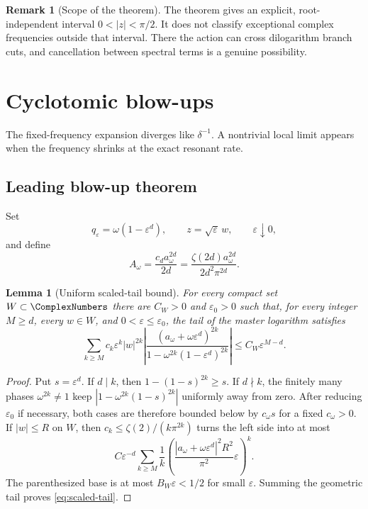 \documentclass[11pt]{article}
\newtheorem{lemma}[theorem]{Lemma}
\theoremstyle{definition}
\newtheorem{remark}[theorem]{Remark}
\newcommand{\eps}{\varepsilon}
\begin{document}
\begin{remark}[Scope of the theorem]
The theorem gives an explicit, root-independent interval
$0<|z|<\pi/2$.  It does not classify exceptional complex frequencies outside
that interval.  There the action can cross dilogarithm branch cuts, and
cancellation between spectral terms is a genuine possibility.
\end{remark}

\section{Cyclotomic blow-ups}

The fixed-frequency expansion diverges like $\delta^{-1}$.  A nontrivial local limit appears when the frequency shrinks at the exact resonant rate.

\subsection{Leading blow-up theorem}

Set
\begin{equation}
 q_\eps=\omega(1-\eps^d),
 \qquad
 z=\sqrt\eps\,w,
 \qquad \eps\downarrow0,
 \label{eq:blowup-scaling}
\end{equation}
and define
\begin{equation}
 A_\omega
 =\frac{c_d a_\omega^{2d}}{2d}
 =\frac{\zeta(2d)a_\omega^{2d}}{2d^2\pi^{2d}}.
 \label{eq:Aomega}
\end{equation}

\begin{lemma}[Uniform scaled-tail bound]
For every compact set $W\subset\ComplexNumbers$ there are $C_W>0$ and $\eps_0>0$ such
that, for every integer $M\ge d$, every $w\in W$, and
$0<\eps\le\eps_0$, the tail of the master logarithm satisfies
\begin{equation}
 \sum_{k\ge M}c_k\eps^k|w|^{2k}
 \left|\frac{(a_\omega+\omega\eps^d)^{2k}}
 {1-\omega^{2k}(1-\eps^d)^{2k}}\right|
 \le C_W\eps^{M-d}.
 \label{eq:scaled-tail}
\end{equation}
\end{lemma}

\begin{proof}
Put $s=\eps^d$.  If $d\mid k$, then
\(
 1-(1-s)^{2k}\ge s
\).
If $d\nmid k$, the finitely many phases $\omega^{2k}\ne1$ keep
$|1-\omega^{2k}(1-s)^{2k}|$ uniformly away from zero.  After reducing
$\eps_0$ if necessary, both cases are therefore bounded below by $c_\omega s$
for a fixed $c_\omega>0$.  If $|w|\le R$ on $W$, then
$c_k\le\zeta(2)/(k\pi^{2k})$ turns the left side into at most
\[
 C\eps^{-d}\sum_{k\ge M}\frac1k
 \left(\frac{|a_\omega+\omega\eps^d|^2R^2}{\pi^2}\eps\right)^k.
\]
The parenthesized base is at most $B_W\eps<1/2$ for small $\eps$.
Summing the geometric tail proves \cref{eq:scaled-tail}.
\end{proof}
\end{document}
